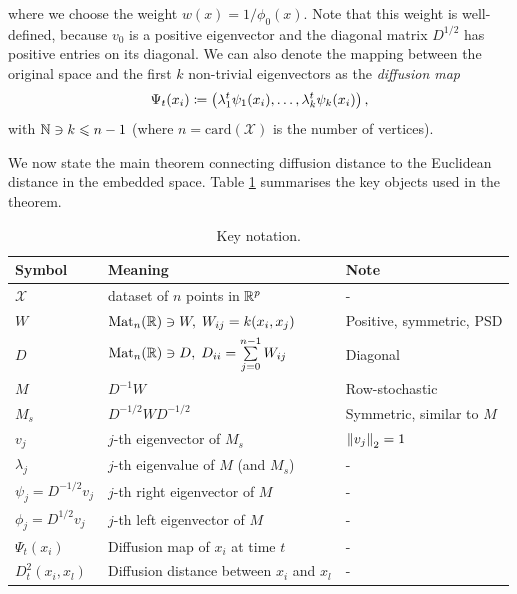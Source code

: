 where we choose the weight $w(x)=1/\phi_0(x)$. Note that this weight is well-defined, because $v_0$ is a positive eigenvector and the diagonal matrix $D^{1/2}$ has positive entries on its diagonal. We can also denote the mapping between the original space and the first $k$ non-trivial eigenvectors as the \textit{diffusion map}
\begin{equation} \label{dif_map}
\begin{split}
\Psi_t(x_i) \coloneqq \left( \lambda_1^t\psi_1(x_i),\dots, \lambda_{k}^t\psi_{k}(x_i)\right),
\end{split}
\end{equation}
with $\mathbb{N}\ni k\leqslant n-1$ (where $n = \text{card}(\mathcal{X})$ is the number of vertices).

We now state the main theorem connecting diffusion distance to the Euclidean distance in the embedded space. Table \ref{tab:notation} summarises the key objects used in the theorem.

\begin{table}[H]
    \centering
    \caption{Key notation.}
    \label{tab:notation}
    \begin{tabular}{llp{6cm}}
        \toprule
        \textbf{Symbol} & \textbf{Meaning} & \textbf{Note} \\
        \midrule
        $\mathcal{X}$ & dataset of $n$ points in  $\mathbb{R}^p$ & - \\
        $W$ & $\text{Mat}_n(\mathbb{R})\ni W,\;W_{ij} = k(x_i, x_j)$ & Positive, symmetric, PSD\\
        $D$ & $\text{Mat}_n(\mathbb{R})\ni D,\;D_{ii}=\sum\limits_{j=0}^{n-1}W_{ij}$ & Diagonal\\
        $M$ & $D^{-1}W$ & Row-stochastic\\
        $M_s$ & $D^{-1/2}WD^{-1/2}$ & Symmetric, similar to $M$ \\
        $v_j$ & $j$-th eigenvector of $M_s$ & $\left\lVert v_j\right\rVert_2 = 1$\\
        $\lambda_j$ & $j$-th eigenvalue of $M$ (and $M_s$) & - \\
        $\psi_j = D^{-1/2}v_j$ & $j$-th right eigenvector of $M$ & - \\
        $\phi_j = D^{1/2}v_j$ & $j$-th left eigenvector of $M$ & - \\
        $\Psi_t(x_i)$ & Diffusion map of $x_i$ at time $t$ & - \\
        $D_t^2(x_i, x_l)$ & Diffusion distance between $x_i$ and $x_l$ & - \\
        \bottomrule
    \end{tabular}
\end{table}

